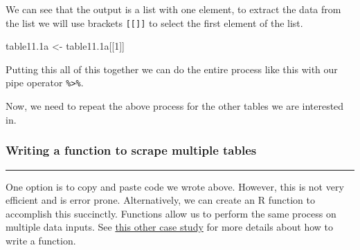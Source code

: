 \documentclass[
]{article}
\newenvironment{Shaded}{\begin{snugshade}}{\end{snugshade}}
\newcommand{\DataTypeTok}[1]{\textcolor[rgb]{0.13,0.29,0.53}{#1}}
\newcommand{\DecValTok}[1]{\textcolor[rgb]{0.00,0.00,0.81}{#1}}
\newcommand{\FloatTok}[1]{\textcolor[rgb]{0.00,0.00,0.81}{#1}}
\newcommand{\KeywordTok}[1]{\textcolor[rgb]{0.13,0.29,0.53}{\textbf{#1}}}
\newcommand{\NormalTok}[1]{#1}
\newcommand{\OperatorTok}[1]{\textcolor[rgb]{0.81,0.36,0.00}{\textbf{#1}}}
\newcommand{\StringTok}[1]{\textcolor[rgb]{0.31,0.60,0.02}{#1}}
\begin{document}
We can see that the output is a list with one element, to extract the
data from the list we will use brackets \texttt{{[}{[}{]}{]}} to select
the first element of the list.

\begin{Shaded}
\begin{Highlighting}[]
\NormalTok{table11}\FloatTok{.1}\NormalTok{a <-}\StringTok{ }\NormalTok{table11}\FloatTok{.1}\NormalTok{a[[}\DecValTok{1}\NormalTok{]]}
\end{Highlighting}
\end{Shaded}

Putting this all of this together we can do the entire process like this
with our pipe operator \texttt{\%\textgreater{}\%}.

\begin{Shaded}
\end{Shaded}

Now, we need to repeat the above process for the other tables we are
interested in.

\hypertarget{writing-a-function-to-scrape-multiple-tables}{%
\subsubsection{\texorpdfstring{\textbf{Writing a function to scrape
multiple
tables}}{Writing a function to scrape multiple tables}}\label{writing-a-function-to-scrape-multiple-tables}}

\begin{center}\rule{0.5\linewidth}{0.5pt}\end{center}

One option is to copy and paste code we wrote above. However, this is
not very efficient and is error prone. Alternatively, we can create an R
function to accomplish this succinctly. Functions allow us to perform
the same process on multiple data inputs. See
\href{https://opencasestudies.github.io/ocs-bloomberg-vaping-case-study/}{this
other case study} for more details about how to write a function.
\end{document}
